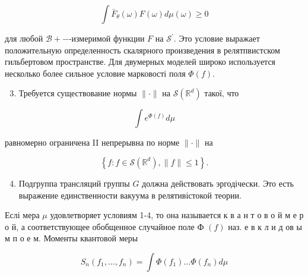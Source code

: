 \documentclass[10pt]{article}
\begin{document}
\[

\int \bar{F}_{\theta}(\omega) F(\omega) d \mu(\omega) \geqslant 0

\]



для любой $\mathscr{B}+-$-измеримой функции $F$ на $\mathscr{S}^{\prime}$. Это условие выражает положительную определенность скалярного произведения в релятпвистском гильбертовом пространстве. Для двумерных моделей широко используется несколько более сильное условие марковості поля $\Phi(f)$.



\begin{enumerate}

  \setcounter{enumi}{2}

  \item Требуется существование нормы $\|\cdot\|$ на $\mathscr{S}\left(\mathbb{R}^{d}\right)$ такої, что

\end{enumerate}



\[

\int e^{\Phi(f)} d \mu

\]



равномерно ограничена II непрерывна по норме $\|\cdot\|$ на



\[

\left\{f: f \in \mathscr{S}\left(\mathbb{R}^{d}\right),\|f\| \leqslant 1\right\} .

\]



\begin{enumerate}

  \setcounter{enumi}{3}

  \item Подгруппа трансляций группы $G$ должна действовать эргодічески. Это есть выражение единственности вакуума в релятивістокой теории.

\end{enumerate}



Еслі мера $\mu$ удовлетворяет условиям 1-4, то она называется к в а н т о в о й м е р о й, а соответствующее обобщенное случайное поле Ф $(f)$ наз. е в к л и д ов ы м п о е м. Моменты квантовой меры



\[

S_{n}\left(f_{1}, \ldots, f_{n}\right)=\int \Phi\left(f_{1}\right) \ldots \Phi\left(f_{n}\right) d \mu

\]
\end{document}
